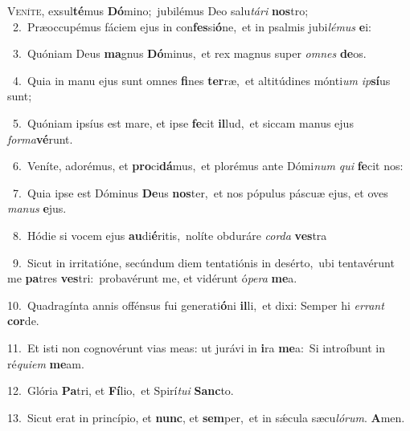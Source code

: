 \lettrine{\initial\textcolor{\initialcolor}{V}}{eníte,} exsul\-\textbf{té}\-mus \textbf{Dó}\-mino;~\star jubilémus Deo salu\-\textit{tá}\-\textit{ri} \textbf{nos}\-tro;\\
{\numbfont\textcolor{\numbcolor}{~2.}}~Præoccupémus fáciem ejus in con\-\textbf{fes}\-si\-\textbf{ó}\-ne,~\star et in psalmis jubi\-\textit{lé}\-\textit{mus} \textbf{e}\-i:\par
{\numbfont\textcolor{\numbcolor}{~3.}}~Quóniam Deus \textbf{ma}\-gnus \textbf{Dó}\-minus,~\star et rex magnus super \textit{om}\-\textit{nes} \textbf{de}\-os.\par
{\numbfont\textcolor{\numbcolor}{~4.}}~Quia in manu ejus sunt omnes \textbf{fi}\-nes \textbf{ter}\-ræ,~\star et altitúdines mónti\textit{um} \textit{ip}\-\textbf{sí}us sunt;\par
{\numbfont\textcolor{\numbcolor}{~5.}}~Quóniam ipsíus est mare, et ipse \textbf{fe}\-cit \textbf{il}\-lud,~\star et siccam manus ejus \textit{for}\-\textit{ma}\textbf{vé}runt.\par
{\numbfont\textcolor{\numbcolor}{~6.}}~Veníte, adorémus, et \textbf{pro}\-ci\-\textbf{dá}\-mus,~\star et plorémus ante Dómi\textit{num} \textit{qui} \textbf{fe}\-cit nos:\par
{\numbfont\textcolor{\numbcolor}{~7.}}~Quia ipse est Dóminus \textbf{De}\-us \textbf{nos}\-ter,~\star et nos pópulus páscuæ ejus, et oves \textit{ma}\-\textit{nus} \textbf{e}\-jus.\par
{\numbfont\textcolor{\numbcolor}{~8.}}~Hódie si vocem ejus \textbf{au}\-di\-\textbf{é}\-ritis,~\star nolíte obduráre \textit{cor}\-\textit{da} \textbf{ves}\-tra\par
{\numbfont\textcolor{\numbcolor}{~9.}}~Sicut in irritatióne, secúndum diem tentatiónis in desérto,~\dagger ubi tentavérunt me \textbf{pa}\-tres \textbf{ves}\-tri:~\star probavérunt me, et vidérunt ó\-\textit{pe}\-\textit{ra} \textbf{me}\-a.\par
{\numbfont\textcolor{\numbcolor}{10.}}~Quadragínta annis offénsus fui generati\-\textbf{ó}\-ni \textbf{il}\-li,~\star et dixi: Semper hi \textit{er}\-\textit{rant} \textbf{cor}\-de.\par
{\numbfont\textcolor{\numbcolor}{11.}}~Et isti non cognovérunt vias meas: ut jurávi in \textbf{i}\-ra \textbf{me}\-a:~\star Si introíbunt in ré\-\textit{qui}\-\textit{em} \textbf{me}\-am.\par
{\numbfont\textcolor{\numbcolor}{12.}}~Glória \textbf{Pa}\-tri, et \textbf{Fí}\-lio,~\star et Spirí\-\textit{tu}\-\textit{i} \textbf{Sanc}\-to.\par
{\numbfont\textcolor{\numbcolor}{13.}}~Sicut erat in princípio, et \textbf{nunc}\-, et \textbf{sem}\-per,~\star et in sǽcula sæcu\-\textit{ló}\-\textit{rum}. \textbf{A}\-men.\par
